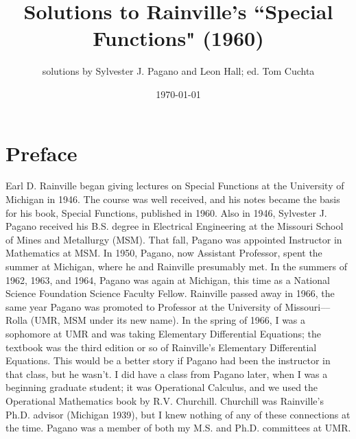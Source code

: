 \documentclass{amsart}
\theoremstyle{definition}
\theoremstyle{remark}
\numberwithin{equation}{section}
\theoremstyle{plain}
\theoremstyle{definition}
\begin{document}
\title{Solutions to Rainville's \textquotedblleft Special Functions" (1960)}
\author{solutions by Sylvester J. Pagano and Leon Hall; ed. Tom Cuchta}

\maketitle 

\tableofcontents \label{toc}

\date{\today}
\newpage
\section{Preface}
Earl D. Rainville began giving lectures on Special Functions at the University of Michigan in 1946.  The course was well received, and his notes became the basis for his book, Special Functions, published in 1960.  Also in 1946, Sylvester J. Pagano received his B.S. degree in Electrical Engineering at the Missouri School of Mines and Metallurgy (MSM).  That fall, Pagano was appointed Instructor in Mathematics at MSM.  In 1950, Pagano, now Assistant Professor, spent the summer at Michigan, where he and Rainville presumably met.  In the summers of 1962, 1963, and 1964, Pagano was again at Michigan, this time as a National Science Foundation Science Faculty Fellow.  Rainville passed away in 1966, the same year Pagano was promoted to Professor at the University of Missouri--–Rolla (UMR, MSM under its new name).  In the spring of 1966, I was a sophomore at UMR and was taking Elementary Differential Equations; the textbook was the third edition or so of Rainville's Elementary Differential Equations.  This would be a better story if Pagano had been the instructor in that class, but he wasn't.  I did have a class from Pagano later, when I was a beginning graduate student; it was Operational Calculus, and we used the Operational Mathematics book by R.V. Churchill.  Churchill was Rainville's Ph.D. advisor (Michigan 1939), but I knew nothing of any of these connections at the time.  Pagano was a member of both my M.S. and Ph.D. committees at UMR.
\end{document}
